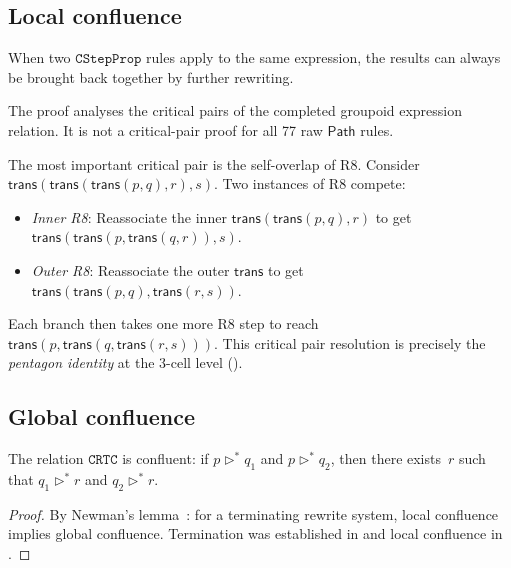\documentclass[manuscript]{BSLstyle}
\newcommand{\Path}{\mathsf{Path}}
\newcommand{\trans}{\mathsf{trans}}
\begin{document}
\subsection{Local confluence}

\begin{theorem}\label{thm:local-confluence}
When two \(\texttt{CStepProp}\) rules apply to the same expression, the results
can always be brought back together by further rewriting.
\end{theorem}

The proof analyses the critical pairs of the completed groupoid expression
relation.  It is not a critical-pair proof for all 77 raw \(\Path\) rules.

\begin{example}\label{ex:nested-assoc}
The most important critical pair is the self-overlap of R8.  Consider
$\trans(\trans(\trans(p,q),r),s)$.  Two instances of R8 compete:
\begin{itemize}
\item \emph{Inner R8}: Reassociate the inner $\trans(\trans(p,q),r)$
  to get $\trans(\trans(p,\trans(q,r)),s)$.
\item \emph{Outer R8}: Reassociate the outer $\trans$ to get
  $\trans(\trans(p,q),\trans(r,s))$.
\end{itemize}
Each branch then takes one more R8 step to reach
$\trans(p,\trans(q,\trans(r,s)))$.  This critical pair resolution
is precisely the \emph{pentagon identity} at the 3-cell level
().
\end{example}

\subsection{Global confluence}

\begin{theorem}\label{thm:confluence}
The relation \(\texttt{CRTC}\) is confluent: if\/
$p \triangleright^* q_1$
and $p \triangleright^* q_2$, then there exists~$r$ such that\/
$q_1 \triangleright^* r$ and $q_2 \triangleright^* r$.
\end{theorem}

\begin{proof}
By Newman's lemma~\cite{Newman42}: for a terminating rewrite system,
local confluence implies global confluence.  Termination was established
in  and local confluence in
.
\end{proof}
\end{document}
